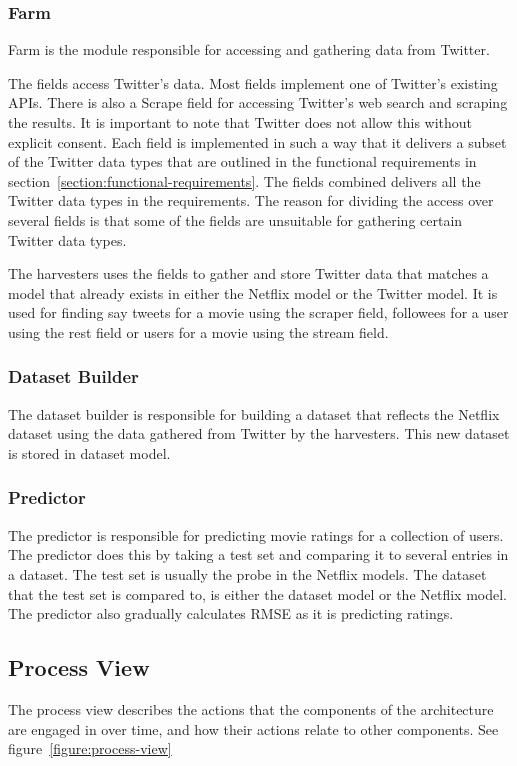 \subsubsection{Farm}
Farm is the module responsible for accessing and gathering data from Twitter.

The fields access Twitter's data. Most fields implement one of Twitter's existing APIs. There is also a Scrape field for accessing Twitter's web search and scraping the results. It is important to note that Twitter does not allow this without explicit consent. Each field is implemented in such a way that it delivers a subset of the Twitter data types that are outlined in the functional requirements in section~\ref{section:functional-requirements}. The fields combined delivers all the Twitter data types in the requirements. The reason for dividing the access over several fields is that some of the fields are unsuitable for gathering certain Twitter data types.

The harvesters uses the fields to gather and store Twitter data that matches a model that already exists in either the Netflix model or the Twitter model. It is used for finding say tweets for a movie using the scraper field, followees for a user using the rest field or users for a movie using the stream field.

\subsubsection{Dataset Builder}
The dataset builder is responsible for building a dataset that reflects the Netflix dataset using the data gathered from Twitter by the harvesters. This new dataset is stored in dataset model.

\subsubsection{Predictor}
The predictor is responsible for predicting movie ratings for a collection of users. The predictor does this by taking a test set and comparing it to several entries in a dataset. The test set is usually the probe in the Netflix models. The dataset that the test set is compared to, is either the dataset model or the Netflix model. The predictor also gradually calculates RMSE as it is predicting ratings.

\subsection{Process View}
The process view describes the actions that the components of the architecture are engaged in over time, and how their actions relate to other components. See figure~\ref{figure:process-view}

